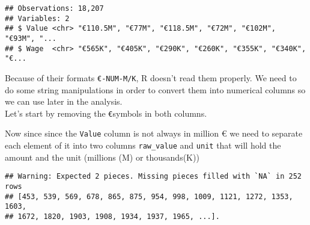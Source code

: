 \documentclass[]{article}
\newenvironment{Shaded}{\begin{snugshade}}{\end{snugshade}}
\newcommand{\DataTypeTok}[1]{\textcolor[rgb]{0.13,0.29,0.53}{#1}}
\newcommand{\KeywordTok}[1]{\textcolor[rgb]{0.13,0.29,0.53}{\textbf{#1}}}
\newcommand{\NormalTok}[1]{#1}
\newcommand{\OperatorTok}[1]{\textcolor[rgb]{0.81,0.36,0.00}{\textbf{#1}}}
\newcommand{\StringTok}[1]{\textcolor[rgb]{0.31,0.60,0.02}{#1}}
\begin{document}
\begin{verbatim}
## Observations: 18,207
## Variables: 2
## $ Value <chr> "€110.5M", "€77M", "€118.5M", "€72M", "€102M", "€93M", "...
## $ Wage  <chr> "€565K", "€405K", "€290K", "€260K", "€355K", "€340K", "€...
\end{verbatim}

Because of their formats \texttt{€-NUM-M/K}, R doesn't read them
properly. We need to do some string manipulations in order to convert
them into numerical columns so we can use later in the analysis.\\
Let's start by removing the \texttt{€}symbols in both columns.

\begin{Shaded}
\end{Shaded}

Now since since the \texttt{Value} column is not always in million € we
need to separate each element of it into two columns \texttt{raw\_value}
and \texttt{unit} that will hold the amount and the unit (millions (M)
or thousands(K))

\begin{Shaded}
\end{Shaded}

\begin{verbatim}
## Warning: Expected 2 pieces. Missing pieces filled with `NA` in 252 rows
## [453, 539, 569, 678, 865, 875, 954, 998, 1009, 1121, 1272, 1353, 1603,
## 1672, 1820, 1903, 1908, 1934, 1937, 1965, ...].
\end{verbatim}
\end{document}
